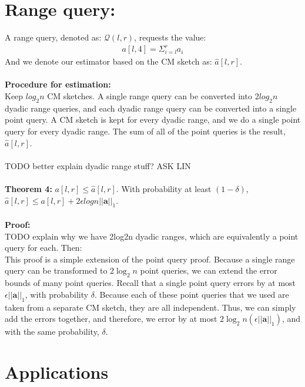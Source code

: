 \documentclass[11pt]{article}
\begin{document}
\section{Range query:}
A range query, denoted as: $\mathcal{Q}(l,r)$, requests the value:
\begin{align*}
    a[l,4] = \Sigma_{i=l}^r a_i
    \end{align*}
    And we denote our estimator based on the CM sketch as: $\hat a[l,r]$.\\\\
    \textbf{Procedure for estimation:}\\
    Keep $log_2n$ CM sketches. A single range query can be converted into $2log_2n$ dyadic range queries, and each dyadic range query can be converted into a single point query. A CM sketch is kept for every dyadic range, and we do a single point query for every dyadic range. The sum of all of the point queries is the result, $\hat a[l,r]$.\\\\
    TODO better explain dyadic range stuff? ASK LIN \\\\
    \textbf{Theorem 4: } $a[l,r] \leq \hat a[l,r]$. With probability at least $(1-\delta)$, $\hat a[l,r] \leq a[l,r] + 2\epsilon logn ||\bm{a}||_1$.\\\\
    \textbf{Proof:}\\
    TODO explain why we have 2log2n dyadic ranges, which are equivalently a point query for each. Then:\\
    This proof is a simple extension of the point query proof. Because a single range query can be transformed to $2\log_2n$ point queries, we can extend the error bounds of many point queries. Recall that a single point query errors by at most $\epsilon ||\bm{a}||_1$, with probability $\delta$. Because each of these point queries that we used are taken from a separate CM sketch, they are all independent. Thus, we can simply add the errors together, and therefore, we error by at most $2\log_2n(\epsilon||\bm{a}||_1)$, and with the same probability, $\delta$.

\section{Applications}
\end{document}
